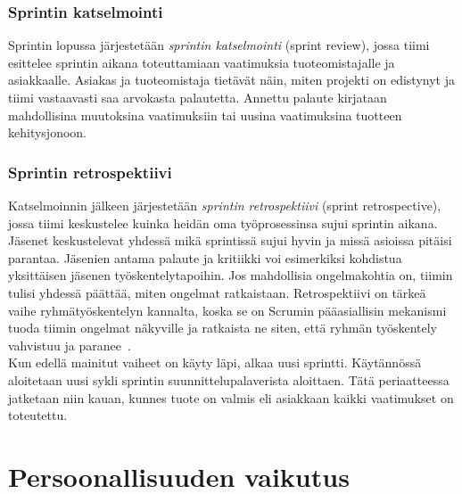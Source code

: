 \documentclass[finnish]{../tktltiki2}
\theoremstyle{definition}
\theoremstyle{remark}
\begin{document}
\subsubsection{Sprintin katselmointi}

Sprintin lopussa järjestetään \emph{sprintin katselmointi} (sprint review), jossa tiimi esittelee sprintin aikana toteuttamiaan
vaatimuksia tuoteomistajalle ja asiakkaalle. Asiakas ja tuoteomistaja
tietävät näin, miten projekti on edistynyt ja tiimi vastaavasti saa
arvokasta palautetta. Annettu palaute kirjataan mahdollisina muutoksina
vaatimuksiin tai uusina vaatimuksina tuotteen kehitysjonoon.

\subsubsection{Sprintin retrospektiivi}

Katselmoinnin jälkeen järjestetään \emph{sprintin retrospektiivi}
(sprint retrospective), jossa tiimi keskustelee kuinka heidän
oma työprosessinsa sujui sprintin aikana. Jäsenet
keskustelevat yhdessä mikä sprintissä sujui hyvin ja missä
asioissa pitäisi parantaa. Jäsenien antama palaute ja kritiikki
voi esimerkiksi kohdistua yksittäisen jäsenen työskentelytapoihin.
Jos mahdollisia ongelmakohtia on, tiimin tulisi yhdessä päättää,
miten ongelmat ratkaistaan. Retrospektiivi on tärkeä vaihe
ryhmätyöskentelyn kannalta, koska se on \newline Scrumin pääasiallisin
mekanismi tuoda tiimin ongelmat näkyville ja ratkaista ne siten,
että ryhmän työskentely vahvistuu ja paranee~\cite{Scrumprimer}.\\

Kun edellä mainitut vaiheet on käyty läpi, alkaa uusi
sprintti. Käytännös\-sä aloitetaan uusi sykli
sprintin suunnittelupalaverista aloittaen. Tätä periaatteessa jatketaan
niin kauan, kunnes tuote on valmis eli asiakkaan kaikki vaatimukset
on toteutettu.


\section{Persoonallisuuden vaikutus}
\end{document}
